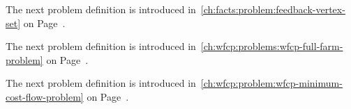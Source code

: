 \gapsizeProblems
The next problem definition is introduced
in~\cref{ch:facts:problem:feedback-vertex-set} on
Page~\pageref{ch:facts:problem:feedback-vertex-set}.
%


\gapsizeProblems
The next problem definition is introduced
in~\cref{ch:wfcp:problems:wfcp-full-farm-problem} on
Page~\pageref{ch:wfcp:problems:wfcp-full-farm-problem}.
% 


\gapsizeProblems
The next problem definition is introduced
in~\cref{ch:wfcp:problem:wfcp-minimum-cost-flow-problem} on
Page~\pageref{ch:wfcp:problem:wfcp-minimum-cost-flow-problem}.
% 

% 